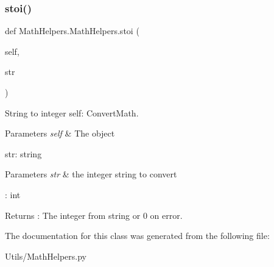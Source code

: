 \subsubsection{\texorpdfstring{stoi()}{stoi()}}
{\footnotesize\ttfamily def Math\+Helpers.\+Math\+Helpers.\+stoi (\begin{DoxyParamCaption}\item[{}]{self,  }\item[{}]{str }\end{DoxyParamCaption})}



String to integer  self\+: Convert\+Math. 


\begin{DoxyParams}{Parameters}
{\em self} & The object\\
\hline
\end{DoxyParams}
str\+: string 
\begin{DoxyParams}{Parameters}
{\em str} & the integer string to convert\\
\hline
\end{DoxyParams}
\+: int \begin{DoxyReturn}{Returns}
\+: The integer from string or 0 on error. 
\end{DoxyReturn}


The documentation for this class was generated from the following file\+:\begin{DoxyCompactItemize}
\item 
Utils/Math\+Helpers.\+py\end{DoxyCompactItemize}
